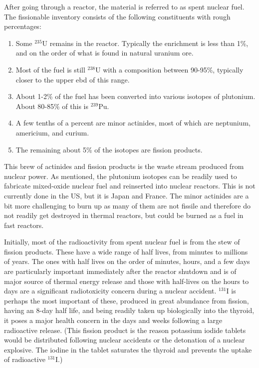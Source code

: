 After going through a reactor, the material is referred to as spent nuclear fuel. The fissionable inventory consists of the following constituents with rough percentages:
\begin{enumerate}
  \item Some $^{235}$U remains in the reactor. Typically the enrichment is less than 1\%, and on the order of what is found in natural uranium ore.
  \item Most of the fuel is still $^{238}$U with a composition between 90-95\%, typically closer to the upper ebd of this range.
  \item About 1-2\% of the fuel has been converted into various isotopes of plutonium. About 80-85\% of this is $^{239}$Pu.
  \item A few tenths of a percent are minor actinides, most of which are neptunium, americium, and curium.
  \item The remaining about 5\% of the isotopes are fission products.
\end{enumerate}

This brew of actinides and fission products is the waste stream produced from nuclear power. As mentioned, the plutonium isotopes can be readily used to fabricate mixed-oxide nuclear fuel and reinserted into nuclear reactors. This is not currently done in the US, but it is Japan and France. The minor actinides are a bit more challenging to burn up as many of them are not fissile and therefore do not readily get destroyed in thermal reactors, but could be burned as a fuel in fast reactors.

Initially, most of the radioactivity from spent nuclear fuel is from the stew of fission products. These have a wide range of half lives, from minutes to millions of years. The ones with half lives on the order of minutes, hours, and a few days are particularly important immediately after the reactor shutdown and is of major source of thermal energy release and those with half-lives on the hours to days are a significant radiotoxicity concern during a nuclear accident. $^{131}$I is perhaps the most important of these, produced in great abundance from fission, having an 8-day half life, and being readily taken up biologically into the thyroid, it poses a major health concern in the days and weeks following a large radioactive release. (This fission product is the reason potassium iodide tablets would be distributed following nuclear accidents or the detonation of a nuclear explosive. The iodine in the tablet saturates the thyroid and prevents the uptake of radioactive $^{131}$I.)

